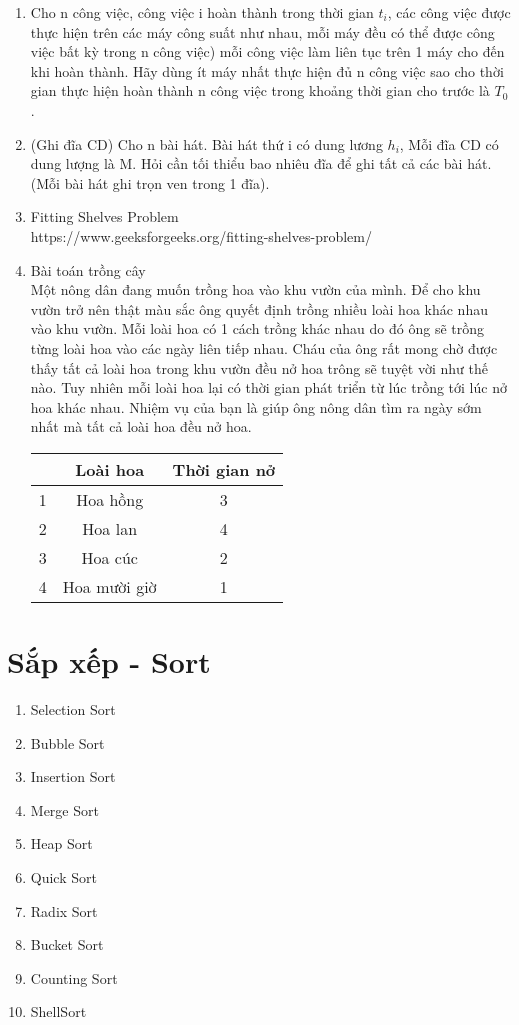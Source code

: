\documentclass[12pt,a4paper]{article}
\begin{document}
\begin{enumerate}
	\item Cho n công việc, công việc i hoàn thành trong thời gian $t_i$, các công việc được thực hiện trên các máy công suất như nhau, mỗi máy đều có thể được công việc bất kỳ trong n công việc) mỗi công việc làm liên tục trên 1 máy cho đến khi hoàn thành. Hãy dùng ít máy nhất thực hiện đủ n công việc sao cho thời gian thực hiện hoàn thành n công việc trong khoảng thời gian cho trước là $T_0$.
	\item (Ghi đĩa CD) Cho n bài hát. Bài hát thứ i có dung lương $h_i$, Mỗi đĩa CD có dung lượng là M. Hỏi cần tối thiểu bao nhiêu đĩa để ghi tất cả các bài hát. (Mỗi bài hát ghi trọn ven trong 1 đĩa).	
	\item Fitting Shelves Problem \\
	https://www.geeksforgeeks.org/fitting-shelves-problem/
	\item Bài toán trồng cây \\
	Một nông dân đang muốn trồng hoa vào khu vườn của mình. Để cho khu vườn trở nên thật màu sắc ông quyết định trồng nhiều loài hoa khác nhau vào khu vườn. Mỗi loài hoa có 1 cách trồng khác nhau do đó ông sẽ trồng từng loài hoa vào các ngày liên tiếp nhau. Cháu của ông rất mong chờ được thấy tất cả loài hoa trong khu vườn đều nở hoa trông sẽ tuyệt vời như thế nào. Tuy nhiên mỗi loài hoa lại có thời gian phát triển từ lúc trồng tới lúc nở hoa khác nhau. Nhiệm vụ của bạn là giúp ông nông dân tìm ra ngày sớm nhất mà tất cả loài hoa đều nở hoa.\\
\begin{center}
	\begin{tabular}{|c|c|c|}
		\hline
		& Loài hoa & Thời gian nở \\
		\hline
		1 & Hoa hồng & 3 \\
		\hline
		2 & Hoa lan & 4 \\
		\hline
		3 & Hoa cúc & 2 \\
		\hline
		4 & Hoa mười giờ & 1 \\
		\hline
	\end{tabular}
\end{center}

\end{enumerate}

\section{Sắp xếp - Sort}
\begin{enumerate}
	\item Selection Sort
	\item Bubble Sort
	\item Insertion Sort
	\item Merge Sort
	\item Heap Sort
	\item Quick Sort
	\item Radix Sort
	\item Bucket Sort
	\item Counting Sort
	\item ShellSort
\end{enumerate}
\end{document}
